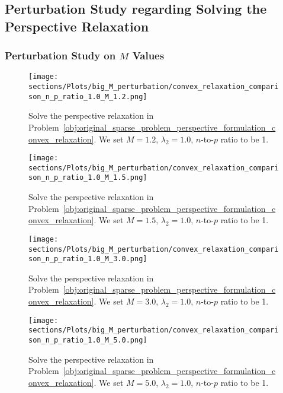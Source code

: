 \subsection{Perturbation Study regarding Solving the Perspective Relaxation}
\label{appendix:numerical_solve_convex_relaxation}

\subsubsection{Perturbation Study on $M$ Values}

\begin{figure*}[!ht]
    \centering
    \texttt{[image: sections/Plots/big\_M\_perturbation/convex\_relaxation\_comparison\_n\_p\_ratio\_1.0\_M\_1.2.png]}
    \caption{Solve the perspective relaxation in Problem~\eqref{obj:original_sparse_problem_perspective_formulation_convex_relaxation}.
    We set $M=1.2$, $\lambda_2=1.0$, $n$-to-$p$ ratio to be 1.}
    \label{fig:solve_convex_relaxation_M_1.2_lambda2_1.0_n_p_ratio_1.0}
\end{figure*}

\begin{figure*}[!ht]
    \centering
    \texttt{[image: sections/Plots/big\_M\_perturbation/convex\_relaxation\_comparison\_n\_p\_ratio\_1.0\_M\_1.5.png]}
    \caption{Solve the perspective relaxation in Problem~\eqref{obj:original_sparse_problem_perspective_formulation_convex_relaxation}.
    We set $M=1.5$, $\lambda_2=1.0$, $n$-to-$p$ ratio to be 1.}
    \label{fig:solve_convex_relaxation_M_1.5_lambda2_1.0_n_p_ratio_1.0}
\end{figure*}

\begin{figure*}[!ht]
    \centering
    \texttt{[image: sections/Plots/big\_M\_perturbation/convex\_relaxation\_comparison\_n\_p\_ratio\_1.0\_M\_3.0.png]}
    \caption{Solve the perspective relaxation in Problem~\eqref{obj:original_sparse_problem_perspective_formulation_convex_relaxation}.
    We set $M=3.0$, $\lambda_2=1.0$, $n$-to-$p$ ratio to be 1.}
    \label{fig:solve_convex_relaxation_M_3.0_lambda2_1.0_n_p_ratio_1.0}
\end{figure*}

\begin{figure*}[!ht]
    \centering
    \texttt{[image: sections/Plots/big\_M\_perturbation/convex\_relaxation\_comparison\_n\_p\_ratio\_1.0\_M\_5.0.png]}
    \caption{Solve the perspective relaxation in Problem~\eqref{obj:original_sparse_problem_perspective_formulation_convex_relaxation}.
    We set $M=5.0$, $\lambda_2=1.0$, $n$-to-$p$ ratio to be 1.}
    \label{fig:solve_convex_relaxation_M_5.0_lambda2_1.0_n_p_ratio_1.0}
\end{figure*}

